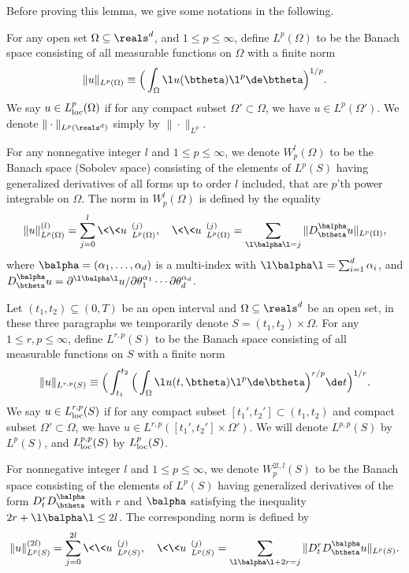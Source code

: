 \documentclass[11pt]{article}
\begin{document}
Before proving this lemma, we give some notations in the following. 

For any open set $\Omega \subseteq \reals^d$, and $1 \le p \le \infty$, define $L^{p}( \Omega)$ to be the Banach space 
consisting of all measurable functions on $\Omega$ with a finite norm 
\begin{align}
\| u \|_{L^{p}(\Omega)} \equiv \Big( \int_{\Omega} \l u(\btheta) \l^p \de \btheta \Big)^{1/p}. 
\end{align}
We say $u \in L^{p}_{\rm loc}(\Omega)$ if for any compact subset $\Omega' \subset \Omega$, we have $u \in L^{p}(\Omega')$. We denote $\| \cdot \|_{L^p(\reals^d)}$ simply by $\| \cdot \|_{L^p}$. 

For any nonnegative integer $l$ and $1 \le p \le \infty$, we denote $W_p^{l}(\Omega)$ to be the Banach space (Sobolev space) consisting of the elements of $L^p(S)$ having generalized derivatives of all forms up to order $l$ included, that are $p$'th power integrable on $\Omega$. The norm in $W_p^l(\Omega)$ is defined by the equality 
\begin{align}
\| u \|_{L^p(\Omega)}^{(l)} = \sum_{j = 0}^{l} \<\< u \>\>_{L^p(\Omega)}^{(j)}, ~~~ \< \< u \> \>_{L^p(\Omega)}^{(j)} = \sum_{\l \balpha \l = j} \| D_\btheta^\balpha u \|_{L^p(\Omega)},
\end{align}
where $\balpha = (\alpha_1, \ldots, \alpha_d)$ is a multi-index with $\l \balpha \l = \sum_{i=1}^d \alpha_i$, and $D^\balpha_\btheta u = \partial^{\l \balpha \l} u / \partial \theta_1^{\alpha_1} \cdots \partial \theta_d^{\alpha_d}$. 


Let $(t_1, t_2) \subseteq (0, T)$ be an open interval and $\Omega \subseteq \reals^d$ be an open set, in these three paragraphs we temporarily denote $S = (t_1, t_2) \times \Omega$. For any $1 \le r, p \le \infty$, define $L^{r, p}(S)$ to be the Banach space consisting of all measurable functions on $S$ with a finite norm 
\begin{align}
\| u \|_{L^{r, p}(S)} \equiv \Big( \int_{t_1}^{t_2} \Big( \int_{\Omega} \l u(t, \btheta) \l^p \de \btheta \Big)^{r/p} \de t \Big)^{1/r}. 
\end{align}
We say $u \in L^{r, p}_{\rm loc}(S)$ if for any compact subset $[t_1', t_2'] \subset (t_1, t_2)$ and compact subset $\Omega' \subset \Omega$, we have $u \in L^{r, p}( [t_1', t_2'] \times \Omega')$. We will denote $L^{p, p}(S)$ by $L^p(S)$, and $L^{p, p}_{\rm loc}(S)$ by $L^p_{\rm loc}(S)$. 

For nonnegative integer $l$ and $1 \le p \le \infty$, we denote $W_p^{2l, l}(S)$ to be the Banach space consisting of the elements of $L^p(S)$ having generalized derivatives of the form $D_t^r D_\btheta^\balpha$ with $r$ and $\balpha$ satisfying the inequality $2r + \l \balpha\l \le 2l$. The corresponding norm  is defined by 
\begin{align}
\| u \|_{L^p(S)}^{(2l)} = \sum_{j = 0}^{2l} \<\< u \>\>_{L^p(S)}^{(j)}, ~~~ \< \< u \> \>_{L^p(S)}^{(j)} = \sum_{\l \balpha\l + 2 r = j} \| D^r_t D^\balpha_\btheta u \|_{L^p(S)}.
\end{align}
\end{document}
